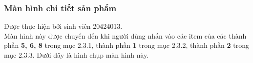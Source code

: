 \documentclass[12pt]{article}
\begin{document}
\subsubsection{Màn hình chi tiết sản phẩm}
Được thực hiện bởi sinh viên 20424013.\\

\indent Màn hình này được chuyển đến khi người dùng nhấn vào các item của các thành phần \textbf{5, 6, 8} trong mục 2.3.1, thành phần \textbf{1} trong mục 2.3.2, thành phần \textbf{2} trong mục 2.3.3. Dưới đây là hình chụp màn hình này.
\end{document}
